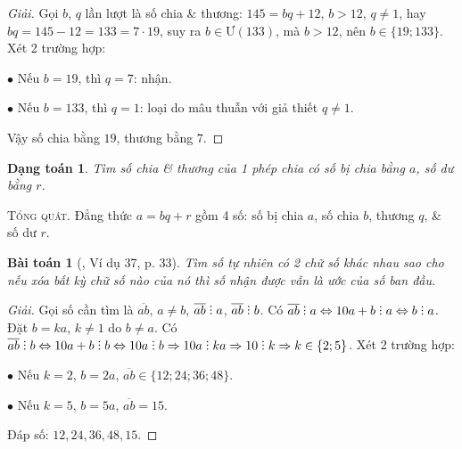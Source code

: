 \documentclass{article}
\numberwithin{equation}{section}
\newtheorem{dangtoan}{Dạng toán}[section]
\newtheorem{baitoan}{Bài toán}[section]
\DeclareRobustCommand{\divby}{%
	\mathrel{\vbox{\baselineskip.65ex\lineskiplimit0pt\hbox{.}\hbox{.}\hbox{.}}}%
}
\begin{document}
\begin{proof}[Giải]
	Gọi $b$, $q$ lần lượt là số chia \& thương: $145 = bq + 12$, $b > 12$, $q\ne 1$, hay $bq = 145 - 12 = 133 = 7\cdot 19$, suy ra $b\in\mbox{Ư}(133)$, mà $b > 12$, nên $b\in\{19;133\}$. Xét 2 trường hợp:
	\begin{enumerate*}
		\item[$\bullet$] Nếu $b = 19$, thì $q = 7$: nhận.
		\item[$\bullet$] Nếu $b = 133$, thì $q = 1$: loại do mâu thuẫn với giả thiết $q\ne 1$.
	\end{enumerate*}
	Vậy số chia bằng $19$, thương bằng $7$.
\end{proof}

\begin{dangtoan}
	Tìm số chia \& thương của 1 phép chia có số bị chia bằng $a$, số dư bằng $r$.
\end{dangtoan}

\textsc{Tổng quát.} Đẳng thức $a = bq + r$ gồm 4 số: số bị chia $a$, số chia $b$, thương $q$, \& số dư $r$.

\begin{baitoan}[\cite{Binh_Toan_6_tap_1}, Ví dụ 37, p. 33]
	Tìm số tự nhiên có 2 chữ số khác nhau sao cho nếu xóa bất kỳ chữ số nào của nó thì số nhận được vẫn là ước của số ban đầu.
\end{baitoan}

\begin{proof}[Giải]
	Gọi số cần tìm là $\overline{ab}$, $a\ne b$, $\overline{ab}\divby a$, $\overline{ab}\divby b$. Có $\overline{ab}\divby a\Leftrightarrow 10a + b\divby a\Leftrightarrow b\divby a$. Đặt $b = ka$, $k\ne 1$ do $b\ne a$. Có $\overline{ab}\divby b\Leftrightarrow 10a + b\divby b\Leftrightarrow 10a\divby b\Rightarrow 10a\divby ka\Rightarrow 10\divby k\Rightarrow k\in\{2;5\}$. Xét 2 trường hợp:
	\begin{enumerate*}
		\item[$\bullet$] Nếu $k = 2$, $b= 2a$, $\overline{ab}\in\{12;24;36;48\}$.
		\item[$\bullet$] Nếu $k = 5$, $b= 5a$, $\overline{ab} = 15$.
	\end{enumerate*}
	Đáp số: $12,24,36,48,15$.
\end{proof}
\end{document}
